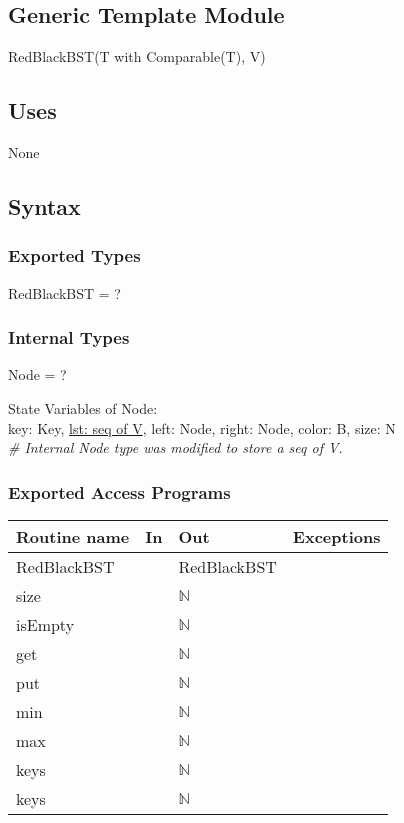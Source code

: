 \documentclass[12pt]{article}
\begin{document}
\subsection*{Generic Template Module}

RedBlackBST(T with Comparable(T), V)

\subsection* {Uses}

None

\subsection* {Syntax}

\subsubsection* {Exported Types}

RedBlackBST = ?

\subsubsection* {Internal Types}

Node = ?

\noindent State Variables of Node:\\
key: Key,
\underline {lst: seq of V},
left: Node,
right: Node,
color: B,
size: N\\

\noindent \textit{\# Internal Node type was modified to store a seq of V.}

\subsubsection* {Exported Access Programs}

\begin{tabular}{| l | l | l | l |}
\hline
\textbf{Routine name} & \textbf{In} & \textbf{Out} & \textbf{Exceptions}\\
\hline
RedBlackBST & ~ & RedBlackBST & \\
\hline
size & ~ & $\mathbb{N}$ & ~\\
\hline
isEmpty & ~ & $\mathbb{N}$ & ~\\
\hline
get & ~ & $\mathbb{N}$ & ~\\
\hline
put & ~ & $\mathbb{N}$ & ~\\
\hline
min & ~ & $\mathbb{N}$ & ~\\
\hline
max & ~ & $\mathbb{N}$ & ~\\
\hline
keys & ~ & $\mathbb{N}$ & ~\\
\hline
keys & ~ & $\mathbb{N}$ & ~\\
\hline
\end{tabular}
\end{document}
